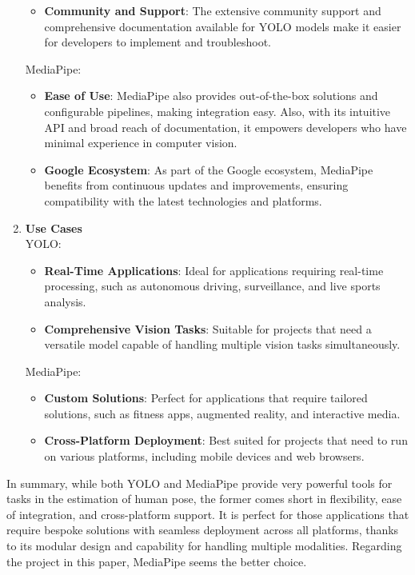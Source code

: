 \begin{enumerate}
\begin{itemize}
                \item \textbf{Community and Support}: The extensive community support and comprehensive documentation available for YOLO models make it easier for developers to implement and troubleshoot.
            \end{itemize}
            MediaPipe:
            \begin{itemize}
                \item \textbf{Ease of Use}: MediaPipe also provides out-of-the-box solutions and configurable pipelines, making integration easy. Also, with its intuitive API and broad reach of documentation, it empowers developers who have minimal experience in computer vision.
                \item \textbf{Google Ecosystem}: As part of the Google ecosystem, MediaPipe benefits from continuous updates and improvements, ensuring compatibility with the latest technologies and platforms.
            \end{itemize}
            \item \textbf{Use Cases}\\
            YOLO:
            \begin{itemize}
                \item \textbf{Real-Time Applications}: Ideal for applications requiring real-time processing, such as autonomous driving, surveillance, and live sports analysis.
                \item \textbf{Comprehensive Vision Tasks}: Suitable for projects that need a versatile model capable of handling multiple vision tasks simultaneously.
            \end{itemize}    
            MediaPipe:
            \begin{itemize}
                \item \textbf{Custom Solutions}: Perfect for applications that require tailored solutions, such as fitness apps, augmented reality, and interactive media.
                \item \textbf{Cross-Platform Deployment}: Best suited for projects that need to run on various platforms, including mobile devices and web browsers.
            \end{itemize}
        \end{enumerate}
        In summary, while both YOLO and MediaPipe provide very powerful tools for tasks in the estimation of human pose, the former comes short in flexibility, ease of integration, and cross-platform support. It is perfect for those applications that require bespoke solutions with seamless deployment across all platforms, thanks to its modular design and capability for handling multiple modalities. Regarding the project in this paper, MediaPipe seems the better choice.

